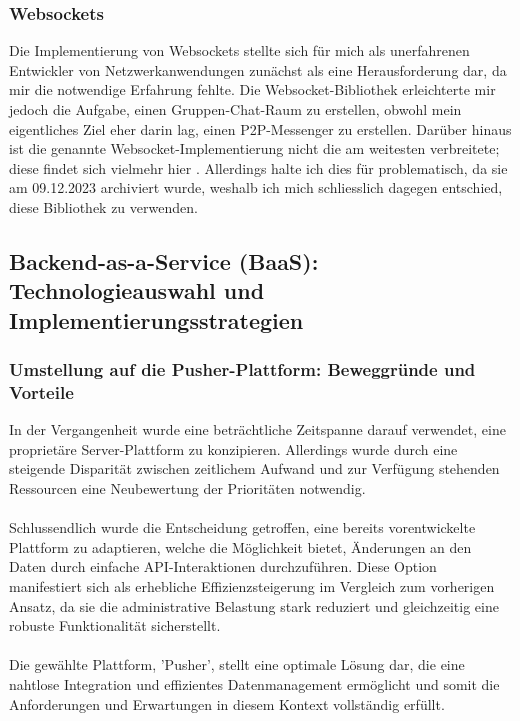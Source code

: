 \subsubsection{Websockets}
Die Implementierung von Websockets stellte sich für mich als unerfahrenen Entwickler von Netzwerkanwendungen zunächst als eine Herausforderung dar, da mir die notwendige Erfahrung fehlte. Die Websocket-Bibliothek \cite{websocket-lib-nhooyr} erleichterte mir jedoch die Aufgabe, einen Gruppen-Chat-Raum zu erstellen, obwohl mein eigentliches Ziel eher darin lag, einen P2P-Messenger zu erstellen. Darüber hinaus ist die genannte Websocket-Implementierung nicht die am weitesten verbreitete; diese findet sich vielmehr hier \cite{websocket-lib-gorrila}. Allerdings halte ich dies für problematisch, da sie am 09.12.2023 archiviert wurde, weshalb ich mich schliesslich dagegen entschied, diese Bibliothek zu verwenden.
\subsection{Backend-as-a-Service (BaaS): Technologieauswahl und Implementierungsstrategien}
\subsubsection{Umstellung auf die Pusher-Plattform: Beweggründe und Vorteile}
In der Vergangenheit wurde eine beträchtliche Zeitspanne darauf verwendet, eine proprietäre Server-Plattform zu konzipieren. Allerdings wurde durch eine steigende Disparität zwischen zeitlichem Aufwand und zur Verfügung stehenden Ressourcen eine Neubewertung der Prioritäten notwendig.\\\\
Schlussendlich wurde die Entscheidung getroffen, eine bereits vorentwickelte Plattform zu adaptieren, welche die Möglichkeit bietet, Änderungen an den Daten durch einfache API-Interaktionen durchzuführen. Diese Option manifestiert sich als erhebliche Effizienzsteigerung im Vergleich zum vorherigen Ansatz, da sie die administrative Belastung stark reduziert und gleichzeitig eine robuste Funktionalität sicherstellt.\\\\
Die gewählte Plattform, 'Pusher', stellt eine optimale Lösung dar, die eine nahtlose Integration und effizientes Datenmanagement ermöglicht und somit die Anforderungen und Erwartungen in diesem Kontext vollständig erfüllt.
